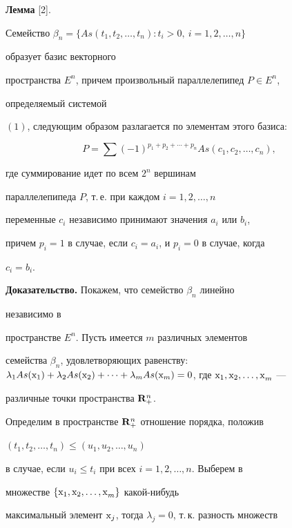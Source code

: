 {\bf Лемма} [2]. {\it 


Семейство $\beta_n=\{As(t_1,t_2,\dotsc,t_n): t_i>0,\ i=1,2,\dotsc,n\}$ 


образует базис векторного  


пространства $E^n$, причем произвольный параллелепипед $P\in E^n$, 


определяемый системой  


$(1)$, следующим образом разлагается по элементам этого базиса\/$:$ 


\begin{equation} 


P=\sum(-1)^{p_1+p_2+\dotsb+p_n}As(c_1,c_2,\dotsc,c_n), 


\end{equation} 


где суммирование идет по всем $2^n$ вершинам  


параллелепипеда $P$, т.\,е. при каждом $i=1,2,\dotsc,n$ 


переменные $c_i$ независимо принимают значения $a_i$ или $b_i$,  


причем $p_i=1$ в случае, если $c_i=a_i$, и $p_i=0$ в случае, когда 


$c_i=b_i$. 


} 


\medskip 


 


{\bf Доказательство.} Покажем, что семейство $\beta_n$ линейно 


независимо в  


пространстве $E^n$. Пусть имеется $m$ различных элементов  


семейства $\beta_n$, удовлетворяющих равенству: $\lambda_1As(\mr{x}_1)+ 


\lambda_2As(\mr{x}_2)+\dotsb


+\lambda_m As(\mr{x}_m)=0$, где $\mr{x_1,x_2,\dotsc,x}_m$ --- 


различные точки пространства $\bold R^n_+$. 


Определим в пространстве $\bold R^n_+$ отношение порядка, положив 


$(t_1,t_2,\dotsc,t_n)\le(u_1,u_2,\dotsc,u_n)$ 


в случае, если $u_i\le t_i$ при всех $i=1,2,\dotsc,n$. Выберем в 


множестве $\{\mathrm{x_1,x_2,\dotsc,x}_m\}$ какой-нибудь  


максимальный элемент $\mathrm{x}_j$, тогда $\lambda_j=0$, т.\,к. разность множеств 


